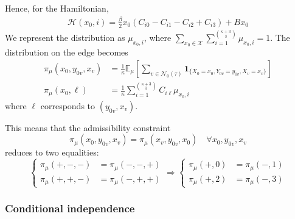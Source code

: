 \documentclass[12pt]{article}
\begin{document}
Hence, for the Hamiltonian,
\begin{align*}
    \mathcal{H}(x_0, i) = \frac\beta2x_0(C_{i0} - C_{i1} - C_{i2} + C_{i3}) + Bx_0
\end{align*}
We represent the distribution as $\mu_{x_0, i}$, where $\sum_{x_0\in \mathcal{X}}\sum_{i=1}^{\kappa+3 \choose 3} \mu_{x_0, i} = 1$.
The distribution on the edge becomes
\begin{align*}
    \pi_\mu(x_0, y_{0v}, x_v) & = \frac1\kappa\mathbb{E}_\mu\left[\sum_{v\in\mathcal{N_0(\tau)}}\mathbf{1}_{\{X_0=x_0, Y_{0v}=y_{0v}, X_v=x_v\}}\right] \\
    \pi_\mu(x_0, \ell)        & = \frac1\kappa\sum_{i=1}^{\kappa+3 \choose 3} C_{i\ell}\mu_{x_0, i}
\end{align*}
where $\ell$ corresponds to $(y_{0v}, x_v)$.

This means that the admissibility constraint
\begin{equation*}
    \pi_\mu(x_0, y_{0v}, x_v) = \pi_\mu(x_v, y_{0v}, x_0) \quad \forall x_0, y_{0v}, x_v
\end{equation*}
reduces to two equalities:
\begin{equation*}
    \begin{cases}
        \pi_\mu(+, -, -) & = \pi_\mu(-, -, +) \\
        \pi_\mu(+, +, -) & = \pi_\mu(-, +, +)
    \end{cases}
    \Rightarrow
    \begin{cases}
        \pi_\mu(+, 0) & = \pi_\mu(-, 1) \\
        \pi_\mu(+, 2) & = \pi_\mu(-, 3)
    \end{cases}
\end{equation*}

\subsubsection{Conditional independence}
\end{document}
